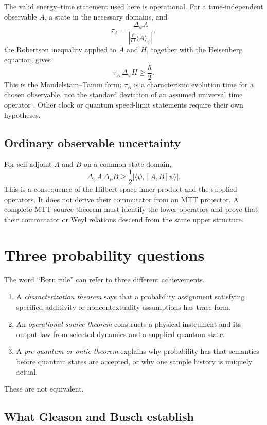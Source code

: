 \documentclass[11pt]{article}
\theoremstyle{definition}
\theoremstyle{remark}
\newcommand{\dd}{\mathrm d}
\let\MTToriginalitem\item
\renewcommand{\item}{\par\MTToriginalitem}
\begin{document}
The valid energy--time statement used here is operational.  For a
time-independent observable \(A\), a state in the necessary domains, and
\[
\tau_A
=
\frac{\Delta_\psi A}
{\left|\frac{\dd}{\dd t}\langle A\rangle_\psi\right|},
\]
the Robertson inequality applied to \(A\) and \(H\), together with the
Heisenberg equation, gives
\[
\tau_A\,\Delta_\psi H\geq\frac{\hbar}{2}.
\]
This is the Mandelstam--Tamm form: \(\tau_A\) is a characteristic evolution
time for a chosen observable, not the standard deviation of an assumed
universal time operator \cite{MandelstamTamm1945}.  Other clock or quantum
speed-limit statements require their own hypotheses.

\subsection{Ordinary observable uncertainty}

For self-adjoint \(A\) and \(B\) on a common state domain,
\[
\Delta_\psi A\,\Delta_\psi B
\geq
\frac12\left|
\langle\psi,[A,B]\psi\rangle
\right|.
\]
This is a consequence of the Hilbert-space inner product and the supplied
operators.  It does not derive their commutator from an MTT projector.  A
complete MTT source theorem must identify the lower operators and prove that
their commutator or Weyl relations descend from the same upper structure.

\section{Three probability questions}
\label{sec:probability}

The word ``Born rule'' can refer to three different achievements.
\begin{enumerate}[leftmargin=2em]
\item A \emph{characterization theorem} says that a probability assignment
      satisfying specified additivity or noncontextuality assumptions has
      trace form.
\item An \emph{operational source theorem} constructs a physical instrument
      and its output law from selected dynamics and a supplied quantum state.
\item A \emph{pre-quantum or ontic theorem} explains why probability has
      that semantics before quantum states are accepted, or why one sample
      history is uniquely actual.
\end{enumerate}
These are not equivalent.

\subsection{What Gleason and Busch establish}
\end{document}
